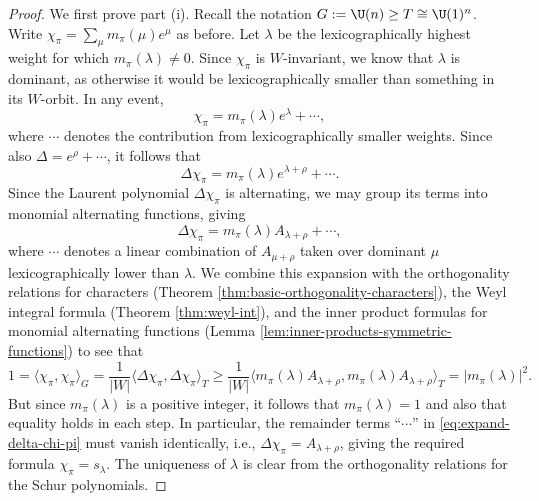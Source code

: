 \documentclass[reqno]{amsart} 
\begin{document}
\begin{proof}
  We first prove part (i).  Recall the notation $G := \U(n) \geq T \cong \U(1)^n$.  Write $\chi_\pi = \sum_{\mu} m_\pi(\mu) e^\mu$ as before.  Let $\lambda$ be the lexicographically highest weight for which $m_\pi(\lambda) \neq 0$.  Since $\chi_\pi$ is $W$-invariant, we know that $\lambda$ is dominant, as otherwise it would be lexicographically smaller than something in its $W$-orbit.  In any event,
  \begin{equation}
    \chi_\pi = m_\pi(\lambda) e^\lambda + \dotsb,
  \end{equation}
  where $\dotsb$ denotes the contribution from lexicographically smaller weights.  Since also $\Delta = e^\rho + \dotsb$, it follows that
  \begin{equation}
    \Delta \chi_\pi = m_\pi(\lambda) e^{\lambda + \rho} + \dotsb.
  \end{equation}
  Since the Laurent polynomial $\Delta \chi_\pi$ is alternating, we may group its terms into monomial alternating functions, giving
  \begin{equation}\label{eq:expand-delta-chi-pi}
    \Delta \chi_\pi = m_\pi(\lambda) A_{\lambda + \rho} + \dotsb,
  \end{equation}
  where $\dotsb$ denotes a linear combination of $A_{\mu + \rho}$ taken over dominant $\mu$ lexicographically lower than $\lambda$.  We combine this expansion with the orthogonality relations for characters (Theorem \ref{thm:basic-orthogonality-characters}), the Weyl integral formula (Theorem \ref{thm:weyl-int}), and the inner product formulas for monomial alternating functions (Lemma \ref{lem:inner-products-symmetric-functions}) to see that
  \begin{equation*}
    1
    = \langle \chi_\pi, \chi_\pi \rangle_G
    =
    \frac{1}{|W|}
    \langle     \Delta \chi_\pi
    ,    \Delta \chi_\pi
    \rangle_T
    \geq
    \frac{1}{|W|}
    \langle     m_\pi(\lambda) A_{\lambda + \rho},     m_\pi(\lambda) A_{\lambda + \rho} \rangle_T
    =
    |m_\pi(\lambda)|^2.
  \end{equation*}
  \begin{equation*}
  \end{equation*}
  But since $m_\pi(\lambda)$ is a positive integer, it follows that $m_\pi(\lambda) = 1$ and also that equality holds in each step.  In particular, the remainder terms ``$\dotsb$'' in \eqref{eq:expand-delta-chi-pi} must vanish identically, i.e., $\Delta \chi_\pi = A_{\lambda+\rho}$, giving the required formula $\chi_\pi = s_\lambda$.  The uniqueness of $\lambda$ is clear from the orthogonality relations for the Schur polynomials.


\end{proof}
\end{document}
